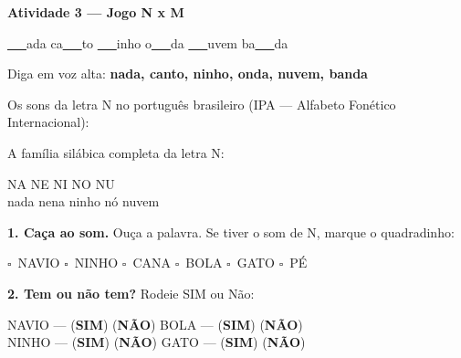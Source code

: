 \begin{consolidacao}
\textbf{Atividade 3 --- Jogo N x M}


\begin{center}
\underline{~~~}ada \quad ca\underline{~~~}to \quad \underline{~~~}inho \quad o\underline{~~~}da \quad \underline{~~~}uvem \quad ba\underline{~~~}da
\end{center}
Diga em voz alta: \textbf{nada, canto, ninho, onda, nuvem, banda}

\end{consolidacao}


\begin{sonsdaletra}
Os sons da letra N no portugu\^es{} brasileiro (IPA --- Alfabeto Fon\'etico Internacional):

\end{sonsdaletra}


\begin{familiasilabica}
A fam\'ilia sil\'abica completa da letra N:

\begin{center}
NA \quad NE \quad NI \quad NO \quad NU \\[0.5em] nada \quad nena \quad ninho \quad n\'o \quad nuvem
\end{center}
\end{familiasilabica}


\begin{somletra}
\textbf{1. Ca\c{c}a ao som.} Ou\c{c}a a palavra. Se tiver o som de N, marque o quadradinho:
\begin{center}
$\square$~NAVIO \quad $\square$~NINHO \quad $\square$~CANA \quad $\square$~BOLA \quad $\square$~GATO \quad $\square$~P\'E
\end{center}

\textbf{2. Tem ou n\~ao{} tem?} Rodeie SIM ou N\~ao:
\begin{center}
NAVIO --- (\textbf{SIM}) (\textbf{N\~AO}) \quad BOLA --- (\textbf{SIM}) (\textbf{N\~AO}) \\ NINHO --- (\textbf{SIM}) (\textbf{N\~AO}) \quad GATO --- (\textbf{SIM}) (\textbf{N\~AO})
\end{center}
\end{somletra}

